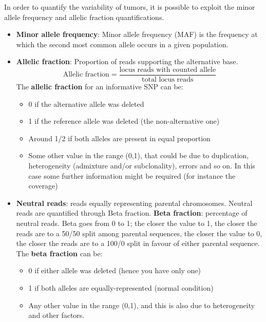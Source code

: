   In order to quantify the variability of tumors, it is possible to exploit the
  minor allele frequency and allelic fraction quantifications.
  \begin{itemize}
    \item \textbf{Minor allele frequency}: Minor allele frequency (MAF) is the
    frequency at which the second most common allele occurs in a given
    population.
    \item \textbf{Allelic fraction}: Proportion of reads supporting the
    alternative base.
    $$
    \text{Allelic fraction} = \frac{\text{locus reads with counted allele}}{\text{total locus reads}} 
    $$ 
    The \textbf{allelic fraction} for an informative SNP can be:
    \begin{itemize}
      \item 0 if the alternative allele was deleted
      \item 1 if the reference allele was deleted (the non-alternative one)
      \item Around 1/2 if both alleles are present in equal proportion
      \item Some other value in the range (0,1), that could be due to
      duplication, heterogeneity (admixture and/or subclonality), errors and so
      on. In this case some further information might be required (for instance
      the coverage)
    \end{itemize}

    \item \textbf{Neutral reads}: reads equally representing parental
    chromosomes. Neutral reads are quantified through Beta fraction.
    \textbf{Beta fraction}: percentage of neutral reads. Beta goes from 0 to 1;
    the closer the value to 1, the closer the reads are to a 50/50 split among
    parental sequences, the closer the value to 0, the closer the reads are to a
    100/0 split in favour of either parental sequence. The \textbf{beta
    fraction} can be:
    \begin{itemize}
      \item 0 if either allele was deleted (hence you have only one)
      \item 1 if both alleles are equally-represented (normal condition)
      \item Any other value in the range (0,1), and this is also due to
      heterogeneity and other factors.\\
    \end{itemize} 
  \end{itemize}

